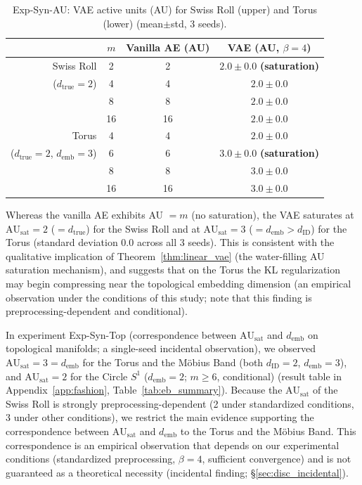 \documentclass[make,article,submit,pdftex,moreauthors]{Definitions/mdpi}
\newcommand{\dID}{d_{\mathrm{ID}}}
\newcommand{\dtrue}{d_{\mathrm{true}}}
\newcommand{\AUsat}{\mathrm{AU}_{\mathrm{sat}}}
\newcommand{\demb}{d_{\mathrm{emb}}}
\begin{document}
\begin{table}[H]
\centering
\caption{Exp-Syn-AU: VAE active units (AU) for Swiss Roll (upper) and Torus (lower) (mean$\pm$std, 3 seeds).}
\label{tab:ea_summary}
\small
\begin{tabular}{rccc}
\toprule
 & $m$ & Vanilla AE (AU) & VAE (AU, $\beta=4$) \\
\midrule
Swiss Roll & 2 & 2 & $2.0\pm0.0$ \textbf{(saturation)} \\
($d_\mathrm{true}=2$) & 4 & 4 & $2.0\pm0.0$ \\
 & 8 & 8 & $2.0\pm0.0$ \\
 & 16 & 16 & $2.0\pm0.0$ \\
\midrule
Torus & 4 & 4 & $2.0\pm0.0$ \\
($d_\mathrm{true}=2$, $d_\mathrm{emb}=3$) & 6 & 6 & $3.0\pm0.0$ \textbf{(saturation)} \\
 & 8 & 8 & $3.0\pm0.0$ \\
 & 16 & 16 & $3.0\pm0.0$ \\
\bottomrule
\end{tabular}
\end{table}

Whereas the vanilla AE exhibits AU $= m$ (no saturation),
the VAE saturates at $\AUsat = 2$ ($= \dtrue$) for the Swiss Roll
and at $\AUsat = 3$ ($= \demb > \dID$) for the Torus (standard deviation 0.0 across all 3 seeds).
This is consistent with the qualitative implication of Theorem~\ref{thm:linear_vae}
(the water-filling AU saturation mechanism),
and suggests that on the Torus the KL regularization may begin compressing near the topological embedding dimension
(an empirical observation under the conditions of this study; note that this finding is preprocessing-dependent and conditional).

In experiment Exp-Syn-Top (correspondence between $\AUsat$ and $\demb$ on
topological manifolds; a single-seed incidental observation), we observed
$\AUsat = 3 = \demb$ for the Torus and the M\"obius Band (both $\dID = 2$,
$\demb = 3$), and $\AUsat = 2$ for the Circle $S^1$ ($\demb = 2$; $m \geq 6$,
conditional) (result table in Appendix~\ref{app:fashion},
Table~\ref{tab:eb_summary}).
Because the $\AUsat$ of the Swiss Roll is strongly preprocessing-dependent
(2 under standardized conditions, 3 under other conditions), we restrict the
main evidence supporting the correspondence between $\AUsat$ and $\demb$ to the
Torus and the M\"obius Band.
This correspondence is an empirical observation that depends on our experimental
conditions (standardized preprocessing, $\beta = 4$, sufficient convergence) and
is not guaranteed as a theoretical necessity (incidental finding;
\S\ref{sec:disc_incidental}).
\end{document}
